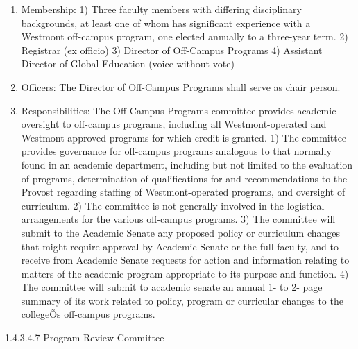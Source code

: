 \documentclass[letterpaper, 11pt]{article}
\begin{document}
				\begin{enumerate}[label=\alph*)]
					\item{Membership:}
					1) Three faculty members with differing disciplinary backgrounds, at least one of whom has significant experience with a Westmont off-campus program, one elected annually to a three-year term.
					2)  Registrar (ex officio)
					3) Director of Off-Campus Programs
					4) Assistant Director of Global Education (voice without vote)
					\item{Officers:}
					The Director of Off-Campus Programs shall serve as chair person.
					\item{Responsibilities: The Off-Campus Programs committee provides academic oversight to off-campus programs, including all Westmont-operated and Westmont-approved programs for which credit is granted.}
					1) The committee provides governance for off-campus programs analogous to that normally found in an academic department, including but not limited to the evaluation of programs, determination of qualifications for and recommendations to the Provost regarding staffing of Westmont-operated programs, and oversight of curriculum.
					2) The committee is not generally involved in the logistical arrangements for the various off-campus programs.
					3) The committee will submit to the Academic Senate any proposed policy or curriculum changes that might require approval by Academic Senate or the full faculty, and to receive from Academic Senate requests for action and information relating to matters of the academic program appropriate to its purpose and function.
					4) The committee will submit to academic senate an annual 1- to 2- page summary of its work related to policy, program or curricular changes to the collegeÕs off-campus programs.
				\end{enumerate}
				1.4.3.4.7 Program Review Committee
\end{document}
